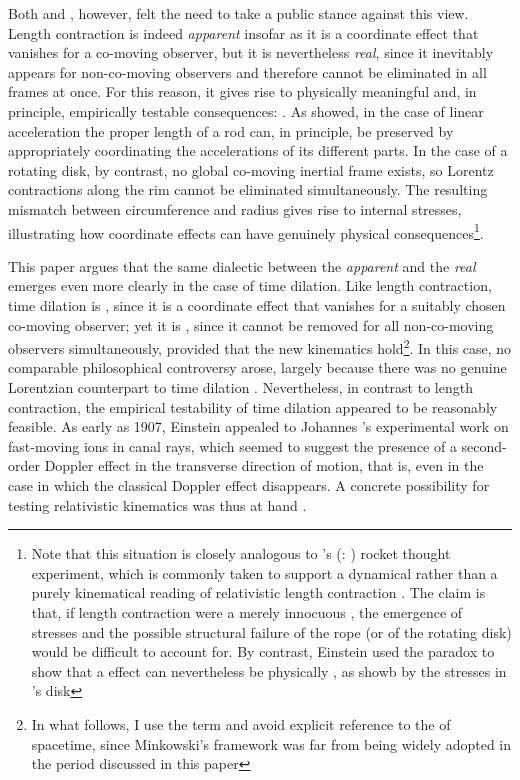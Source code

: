 \documentclass[pdflatex,sn-basic]{sn-jnl}
\newcommand{\EP}{\Ehr paradox\xspace}
\renewcommand{\citets}[2][]{\citeauthor{#2}'s (\citeyear{#2}\if\relax\detokenize{#1}\relax\else: #1\fi)}
\begin{document}
Both \citet{Ehrenfest1910} and \citet{Einstein1911d}, however, felt the need to take a public stance against this view. Length contraction is indeed \emph{apparent} insofar as it is a coordinate effect that vanishes for a co-moving observer, but it is nevertheless \emph{real}, since it inevitably appears for non-co-moving observers and therefore cannot be eliminated in all frames at once. For this reason, it gives rise to physically meaningful and, in principle, empirically testable consequences:  \citep[510]{Einstein1911d}. As \citet{Born1909} showed, in the case of linear acceleration the proper length of a rod can, in principle, be preserved by appropriately coordinating the accelerations of its different parts. In the case of a rotating disk, by contrast, no global co-moving inertial frame exists, so Lorentz contractions along the rim cannot be eliminated simultaneously. The resulting mismatch between circumference and radius gives rise to internal stresses, illustrating how  coordinate effects can have genuinely  physical consequences\footnote{Note that this situation is closely analogous to \citets{Bell1976} rocket thought experiment, which is commonly taken to support a dynamical rather than a purely kinematical reading of relativistic length contraction \citep{Brown2001}. The claim is that, if length contraction were a merely innocuous , the emergence of stresses and the possible structural failure of the rope (or of the rotating disk) would be difficult to account for. By contrast, Einstein used the \EP to show that a  effect can nevertheless be physically , as showb by the stresses in \Ehr's disk}.

This paper argues that the same dialectic between the \emph{apparent} and the \emph{real} emerges even more clearly in the case of time dilation. Like length contraction, time dilation is , since it is a coordinate effect that vanishes for a suitably chosen co-moving observer; yet it is , since it cannot be removed for all non-co-moving observers simultaneously, provided that the new kinematics hold\footnote{In what follows, I use the term  and avoid explicit reference to the  of spacetime, since Minkowski’s framework was far from being widely adopted in the period discussed in this paper}. In this case, no comparable philosophical controversy arose, largely because there was no genuine Lorentzian counterpart to time dilation \citep{Rindler1970}. Nevertheless, in contrast to length contraction, the empirical testability of time dilation appeared to be reasonably feasible. As early as 1907, Einstein appealed to Johannes \citet{Stark1906}’s experimental work on fast-moving ions in canal rays, which seemed to suggest the presence of a second-order Doppler effect in the transverse direction of motion, that is, even in the case in which the classical Doppler effect disappears. A concrete possibility for testing relativistic kinematics was thus at hand \citep{Giuliani2013}. 
\end{document}
